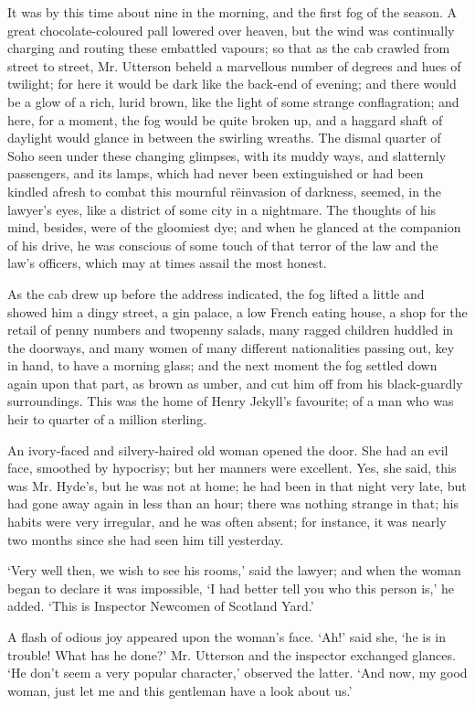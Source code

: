 \documentclass[]{novel}
\begin{document}
It was by this time about nine in the morning, and the first fog of the season. A great chocolate-coloured pall lowered over heaven, but the wind was continually charging and routing these embattled vapours; so that as the cab crawled from street to street, Mr. Utterson beheld a marvellous number of degrees and hues of twilight; for here it would be dark like the back-end of evening; and there would be a glow of a rich, lurid brown, like the light of some strange conflagration; and here, for a moment, the fog would be quite broken up, and a haggard shaft of daylight would glance in between the swirling wreaths. The dismal quarter of Soho seen under these changing glimpses, with its muddy ways, and slatternly passengers, and its lamps, which had never been extinguished or had been kindled afresh to combat this mournful rëinvasion of darkness, seemed, in the lawyer’s eyes, like a district of some city in a nightmare. The thoughts of his mind, besides, were of the gloomiest dye; and when he glanced at the companion of his drive, he was conscious of some touch of that terror of the law and the law’s officers, which may at times assail the most honest.

As the cab drew up before the address indicated, the fog lifted a little and showed him a dingy street, a gin palace, a low French eating house, a shop for the retail of penny numbers and twopenny salads, many ragged children huddled in the doorways, and many women of many different nationalities passing out, key in hand, to have a morning glass; and the next moment the fog settled down again upon that part, as brown as umber, and cut him off from his black-guardly surroundings. This was the home of Henry Jekyll’s favourite; of a man who was heir to quarter of a million sterling.

An ivory-faced and silvery-haired old woman opened the door. She had an evil face, smoothed by hypocrisy; but her manners were excellent. Yes, she said, this was Mr. Hyde’s, but he was not at home; he had been in that night very late, but had gone away again in less than an hour; there was nothing strange in that; his habits were very irregular, and he was often absent; for instance, it was nearly two months since she had seen him till yesterday.

‘Very well then, we wish to see his rooms,’ said the lawyer; and when the woman began to declare it was impossible, ‘I had better tell you who this person is,’ he added. ‘This is Inspector Newcomen of Scotland Yard.’

A flash of odious joy appeared upon the woman’s face. ‘Ah!’ said she, ‘he is in trouble! What has he done?’
Mr. Utterson and the inspector exchanged glances. ‘He don’t seem a very popular character,’ observed the latter. ‘And now, my good woman, just let me and this gentleman have a look about us.’
\end{document}
